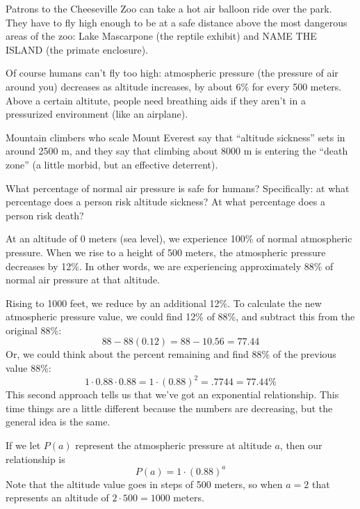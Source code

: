 
\begin{boxexplore}[No pressure]
Patrons to the Cheeseville Zoo can take a hot air balloon ride over the park. They have to fly high enough to be at a safe distance above the most dangerous areas of the zoo: Lake Mascarpone (the reptile exhibit) and NAME THE ISLAND (the primate enclosure).

Of course humans can't fly too high: atmospheric pressure (the pressure of air around you) decreases as altitude increases, by about 6\% for every 500 meters. Above a certain altitute, people need breathing aids if they aren't in a pressurized environment (like an airplane).

Mountain climbers who scale Mount Everest say that ``altitude sickness'' sets in around 2500 m, and they say that climbing about 8000 m is entering the ``death zone'' (a little morbid, but an effective deterrent).

What percentage of normal air pressure is safe for humans? Specifically: at what percentage does a person risk altitude sickness? At what percentage does a person risk death?

\end{boxexplore}

At an altitude of 0 meters (sea level), we experience 100\% of normal atmospheric pressure. When we rise to a height of 500 meters, the atmospheric pressure decreases by 12\%. In other words, we are experiencing approximately 88\% of normal air pressure at that altitude.

Rising to 1000 feet, we reduce by an additional 12\%. To calculate the new atmospheric pressure value, we could find 12\% of 88\%, and subtract this from the original 88\%:
\[88 - 88(0.12) = 88 - 10.56 = 77.44\]
Or, we could think about the percent remaining and find 88\% of the previous value 88\%:
\[1\cdot0.88\cdot0.88 = 1\cdot(0.88)^2 = .7744 = 77.44\%\]
This second approach tells us that we've got an exponential relationship. This time things are a little different because the numbers are decreasing, but the general idea is the same.

If we let $P(a)$ represent the atmospheric pressure at altitude $a$, then our relationship is
\[P(a) = 1 \cdot (0.88)^a\]
Note that the altitude value goes in steps of 500 meters, so when $a=2$ that represents an altitude of $2\cdot500 = 1000$ meters.

